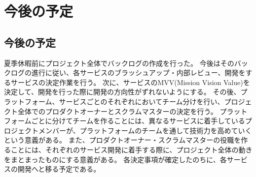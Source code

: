 \chapter{今後の予定}
\section{今後の予定}

夏季休暇前にプロジェクト全体でバックログの作成を行った。
今後はそのバックログの進行に従い、各サービスのブラッシュアップ・内部レビュー、開発をするサービスの決定作業を行う。
次に、サービスのMVV(Mission Vision Value)を決定して、開発を行った際に開発の方向性がずれないようにする。
その後、プラットフォーム、サービスごとのそれぞれにおいてチーム分けを行い、プロジェクト全体でのプロダクトオーナーとスクラムマスターの決定を行う。
プラットフォームごとに分けてチームを作ることには、異なるサービスに着手しているプロジェクトメンバーが、プラットフォームのチームを通して技術力を高めていくという意義がある。
また、プロダクトオーナー・スクラムマスターの役職を作ることには、それぞれのサービス開発に着手する際に、プロジェクト全体の動きをまとまったものにする意義がある。
各決定事項が確定したのちに、各サービスの開発へと移る予定である。

